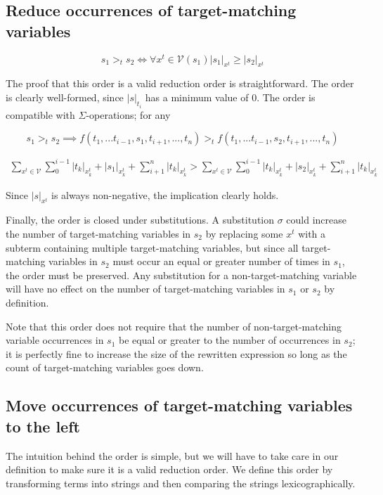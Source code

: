 \subsection{Reduce occurrences of target-matching variables}

\[ s_1 >_t s_2 \iff \forall x^t \in \mathcal{V}(s_1) |s_1|_{x^t} \geq |s_2|_{x^t}
\]

The proof that this order is a valid reduction order is straightforward. The order is clearly well-formed, since $|s|_{t_i}$ has a minimum value of 0. The order is compatible with $\Sigma$-operations; for any

\[ s_1 >_t s_2 \implies f(t_1,...t_{i-1},s_1,t_{i+1},...,t_n) >_t f(t_1,...t_{i-1},s_2,t_{i+1},...,t_n)
\]

\begin{align*}
\sum_{x^t \in \mathcal{V}} \sum_{0}^{i - 1} |t_k|_{x^t_k} + |s_1|_{x^t_k} + \sum_{i + 1}^{n} |t_k|_{x^t_k} >
\sum_{x^t \in \mathcal{V}} \sum_{0}^{i - 1} |t_k|_{x^t_k} + |s_2|_{x^t_k} + \sum_{i + 1}^{n} |t_k|_{x^t_k}
\end{align*}

Since $|s|_{x^t}$ is always non-negative, the implication clearly holds.

Finally, the order is closed under substitutions. A substitution $\sigma$ could increase the number of target-matching variables in $s_2$ by replacing some $x^t$ with a subterm containing multiple target-matching variables, but since all target-matching variables in $s_2$ must occur an equal or greater number of times in $s_1$, the order must be preserved. Any substitution for a non-target-matching variable will have no effect on the number of target-matching variables in $s_1$ or $s_2$ by definition. 

Note that this order does not require that the number of non-target-matching variable occurrences in $s_1$ be equal or greater to the number of occurrences in $s_2$; it is perfectly fine to increase the size of the rewritten expression so long as the count of target-matching variables goes down. 

\subsection{Move occurrences of target-matching variables to the left}

The intuition behind the order is simple, but we will have to take care in our definition to make sure it is a valid reduction order. We define this order by transforming terms into strings and then comparing the strings lexicographically.

